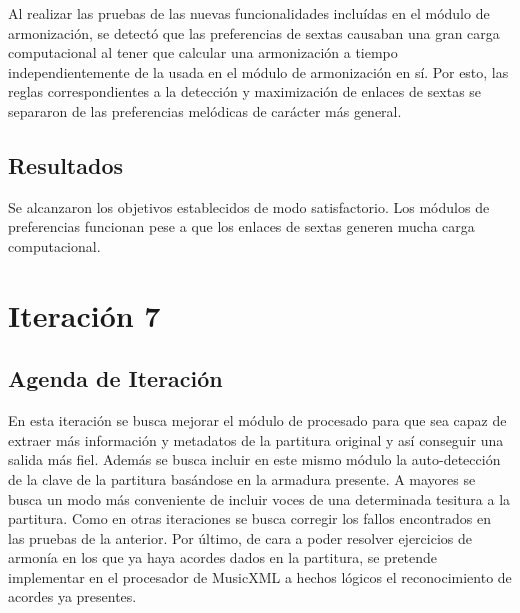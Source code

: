 Al realizar las pruebas de las nuevas funcionalidades incluídas en el módulo de armonización, se detectó que las preferencias de sextas causaban una gran carga computacional al tener que calcular una armonización a tiempo independientemente de la usada en el módulo de armonización en sí. Por esto, las reglas correspondientes a la detección y maximización de enlaces de sextas se separaron de las preferencias melódicas de carácter más general. 

\subsection{Resultados}
Se alcanzaron los objetivos establecidos de modo satisfactorio.
Los módulos de preferencias funcionan pese a que los enlaces de sextas generen mucha carga computacional.

\section{Iteración 7}
\subsection{Agenda de Iteración}
En esta iteración se busca mejorar el módulo de procesado para que sea capaz de extraer más información y metadatos de la partitura original y así conseguir una salida más fiel. Además se busca incluir en este mismo módulo la auto-detección de la clave de la partitura basándose en la armadura presente. A mayores se busca un modo más conveniente de incluir voces de una determinada tesitura a la partitura. Como en otras iteraciones se busca corregir los fallos encontrados en las pruebas de la anterior. Por último, de cara a poder resolver ejercicios de armonía en los que ya haya acordes dados en la partitura, se pretende implementar en el procesador de MusicXML a hechos lógicos el reconocimiento de acordes ya presentes.

